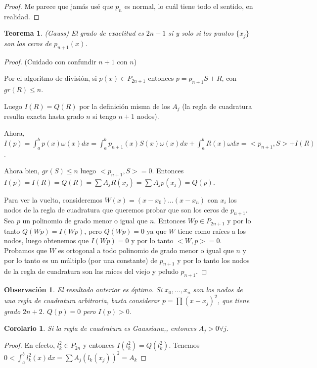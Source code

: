 \documentclass[10pt,a4paper,final]{report}
\newtheorem{theorem}{Teorema}
\newtheorem{observation}{Observación}
\newtheorem{corollary}{Corolario}
\begin{document}
{\begin{proof}
	Me parece que jamás usé que $p_n$ es normal, lo cuál tiene todo el sentido, en realidad.
\end{proof}

\begin{theorem} (Gauss) El grado de exactitud es $2n+1$ si y solo si los puntos $\{x_j\}$ son los ceros de $p_{n+1}(x)$.
\end{theorem}

\begin{proof}
	(Cuidado con confundir $n+1$ con $n$)
	
	Por el algoritmo de división, si $p(x) \in P_{2n+1}$ entonces $p = p_{n+1} S + R$, con $gr(R) \leq n$.
	
Luego $I(R) = Q(R)$ por la definición misma de los $A_j$ (la regla de cuadratura resulta exacta hasta grado $n$ si tengo $n+1$ nodos).

Ahora, $I(p) = \int_a^b p(x) \omega(x) dx = \int_a^b p_{n+1}(x) S(x) \omega(x) dx + \int_a^b R(x) \omega dx = <p_{n+1},S> + I(R)$.

Ahora bien, $gr(S) \leq n$ luego $<p_{n+1},S> = 0$. Entonces $I(p) = I(R) = Q(R) = \displaystyle \sum A_j R(x_j) = \displaystyle \sum A_j p(x_j) = Q(p)$.

Para ver la vuelta, consideremos $W(x) = (x-x_0)...(x-x_n)$ con $x_i$ los nodos de la regla de cuadratura que queremos probar que son los ceros de $p_{n+1}$. Sea $p$ un polinomio de grado menor o igual que $n$. Entonces $Wp \in P_{2n+1}$ y por lo tanto $Q(Wp) = I(Wp)$, pero $Q(Wp) = 0$ ya que $W$ tiene como raíces a los nodos, luego obtenemos que $I(Wp)=0$ y por lo tanto $<W,p>=0$. Probamos que $W$ es ortogonal a todo polinomio de grado menor o igual que $n$ y por lo tanto es un múltiplo (por una constante) de $p_{n+1}$ y por lo tanto los nodos de la regla de cuadratura son las raíces del viejo y peludo $p_{n+1}$.	
\end{proof}

\begin{observation}
El resultado anterior es óptimo. Si $x_0,...,x_n$ son los nodos de una regla de cuadratura arbitraria, basta considerar $p =\displaystyle \prod (x-x_j)^2$, que tiene grado $2n+2$. $Q(p)=0$ pero $I(p) > 0$.
\end{observation}

\begin{corollary}
	Si la regla de cuadratura es Gaussiana,, entonces $A_j>0 \forall j$.
\end{corollary}

\begin{proof}
	En efecto, $l_k^2 \in P_{2n}$ y entonces $I(l_k^2) = Q(l_k^2)$. Tenemos $0 < \int_a^b l_k^2(x) dx = \displaystyle \sum A_j (l_k(x_j))^2 = A_k$
\end{proof}

}
\end{document}
